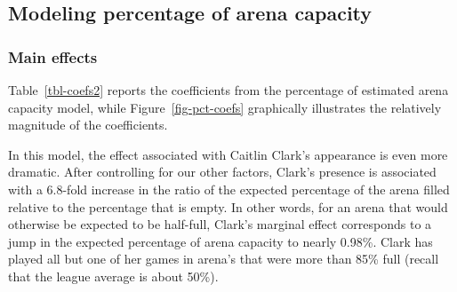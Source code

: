 \documentclass[
  letterpaper,
  DIV=11,
  numbers=noendperiod]{scrartcl}
\begin{document}
\subsection{Modeling percentage of arena
capacity}\label{modeling-percentage-of-arena-capacity}

\subsubsection{Main effects}\label{main-effects}

Table~\ref{tbl-coefs2} reports the coefficients from the percentage of
estimated arena capacity model, while Figure~\ref{fig-pct-coefs}
graphically illustrates the relatively magnitude of the coefficients.

\begin{table}

\caption{\label{tbl-coefs2}Table of coefficients from percentage of
estimated arena capacity model.}


\end{table}%

In this model, the effect associated with Caitlin Clark's appearance is
even more dramatic. After controlling for our other factors, Clark's
presence is associated with a 6.8-fold increase in the ratio of the
expected percentage of the arena filled relative to the percentage that
is empty. In other words, for an arena that would otherwise be expected
to be half-full, Clark's marginal effect corresponds to a jump in the
expected percentage of arena capacity to nearly 0.98\%. Clark has played
all but one of her games in arena's that were more than 85\% full
(recall that the league average is about 50\%).
\end{document}
